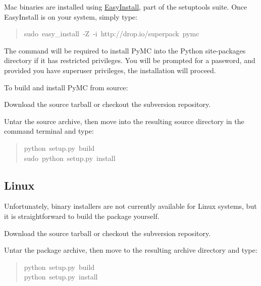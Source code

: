 Mac binaries are installed using \href{http://peak.telecommunity.com/DevCenter/EasyInstall}{EasyInstall}, part of the setuptools suite.
Once EasyInstall is on your system, simply type:
\begin{quote}{\ttfamily \raggedright \noindent
sudo~easy{\_}install~-Z~-i~http://drop.io/superpack~pymc
}\end{quote}

The  command will be required to install PyMC into the Python site-packages
directory if it has restricted privileges. You will be prompted for a  password, and
provided you have superuser privileges, the installation will proceed.

To build and install PyMC from source:
\setcounter{listcnt0}{0}
\begin{list}{.}
{
\setlength{\rightmargin}{\leftmargin}
}
\item {} 
Download the source tarball or checkout the subversion repository.

\item {} 
Untar the source archive, then move into the resulting source directory in
the command terminal and type:
\begin{quote}{\ttfamily \raggedright \noindent
python~setup.py~build~\\
sudo~python~setup.py~install
}\end{quote}

\end{list}



\hypertarget{linux}{}
\subsection*{Linux}
\label{linux}

Unfortunately, binary installers are not currently available for Linux systems,
but it is straightforward to build the package yourself.
\setcounter{listcnt0}{0}
\begin{list}{.}
{
\setlength{\rightmargin}{\leftmargin}
}
\item {} 
Download the source tarball or checkout the subversion repository.

\item {} 
Untar the package archive, then move to the resulting archive directory and type:
\begin{quote}{\ttfamily \raggedright \noindent
python~setup.py~build~\\
python~setup.py~install
}\end{quote}

\end{list}

